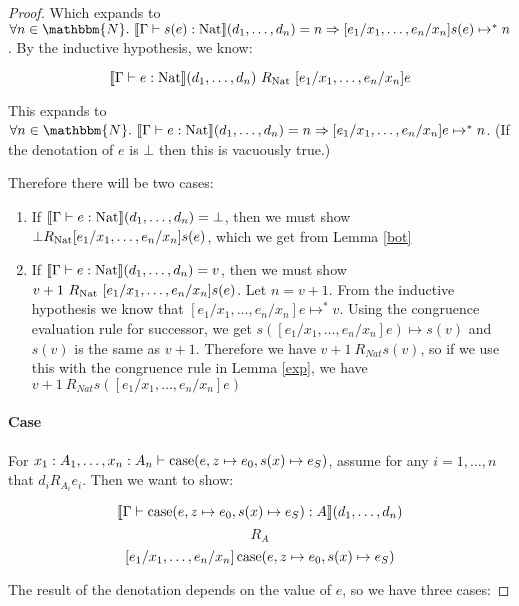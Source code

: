 \begin{proof}
Which expands to $\forall n \in \mathbbm{N}. \ \llbracket \Gamma \vdash s(e) : \nat \rrbracket (d_1, \dots, d_n) = n \Rightarrow [e_1/x_1, \dots, e_n/x_n]s(e) \mapsto^* n $. By the inductive hypothesis, we know:

\[ \llbracket \Gamma \vdash e : \operatorname{Nat} \rrbracket (d_1, \dots, d_n) \ R_{\operatorname{Nat}} \ [e_1/x_1, \dots, e_n/x_n]e \]

This expands to $\forall n \in \mathbbm{N}. \ \llbracket \Gamma \vdash e : \nat \rrbracket (d_1, \dots, d_n) = n \Rightarrow [e_1/x_1, \dots, e_n/x_n]e \mapsto^* n $. (If the denotation of $e$ is $\bot$ then this is vacuously true.)

Therefore there will be two cases:

\begin{enumerate}
\item{If $\llbracket \Gamma \vdash e : \operatorname{Nat} \rrbracket (d_1, \dots, d_n) = \bot$, then we must show $\bot R_{\operatorname{Nat}} [e_1/x_1, \dots, e_n/x_n]s(e)$, which we get from Lemma \ref{bot}}%
\item{If $\llbracket \Gamma \vdash e : \operatorname{Nat} \rrbracket (d_1, \dots, d_n) = v$, then we must show $v+1 \ R_{\operatorname{Nat}} \ [e_1/x_1, \dots, e_n/x_n]s(e)$. Let $n = v + 1$. From the inductive hypothesis we know that $[e_1/x_1, \dots, e_n/x_n]e \mapsto^* v$. Using the congruence evaluation rule for successor, we get $s([e_1/x_1, \dots, e_n/x_n]e) \mapsto s(v)$ and $s(v)$ is the same as $v+1$. Therefore we have $v + 1 \ R_{Nat} s(v)$, so if we use this with the congruence rule in Lemma \ref{exp}, we have  $v + 1 \ R_{Nat} s([e_1/x_1, \dots, e_n/x_n]e)$ }
\end{enumerate}

\paragraph{Case} For $x_1 : A_1, \dots, x_n : A_n \vdash \operatorname{case} (e,z \mapsto e_0, s(x) \mapsto e_S)$, assume for any $i = 1, \dots, n$ that $d_i R_{A_i} e_i$. Then we want to show:


\[ \llbracket \Gamma \vdash \operatorname{case}(e,z \mapsto e_0, s(x) \mapsto e_S) : A \rrbracket (d_1, \dots, d_n) \]
\[ R_A \]
\[ [e_1/x_1, \dots, e_n/x_n]\operatorname{case} (e, z \mapsto e_0, s(x) \mapsto e_S) \]

The result of the denotation depends on the value of $e$, so we have three cases:


\end{proof}

